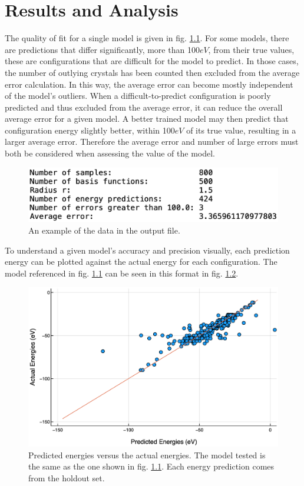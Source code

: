 \chapter{Results and Analysis}\label{Sect:results}
\par The quality of fit for a single model is given in fig. \ref{outputExample}. For some models, there are predictions that differ significantly, more than 100$eV$, from their true values, these are configurations that are difficult for the model to predict. In those cases, the number of outlying crystals has been counted then excluded from the average error calculation. In this way, the average error can become mostly independent of the model's outliers. When a difficult-to-predict configuration is poorly predicted and thus excluded from the average error, it can reduce the overall average error for a given model. A better trained model may then predict that configuration energy slightly better, within 100$eV$ of its true value, resulting in a larger average error. Therefore the average error and number of large errors must both be considered when assessing the value of the model. 

\begin{figure}%
\centering
\includegraphics[scale = 0.5]{Figures/outputExample}
\caption{An example of the data in the output file. 
\label{outputExample}} 
\end{figure}

\par To understand a given model's accuracy and precision visually, each prediction energy can be plotted against the actual energy for each configuration. The model referenced in fig. \ref{outputExample} can be seen in this format in fig. \ref{accuracyPlot}.

\begin{figure}%
\centering
\includegraphics[scale = 0.4]{Figures/accuracyPlot}
\caption{Predicted energies versus the actual energies. The model tested is the same as the one shown in fig. \ref{outputExample}. Each energy prediction comes from the holdout set.
\label{accuracyPlot}} 
\end{figure}

